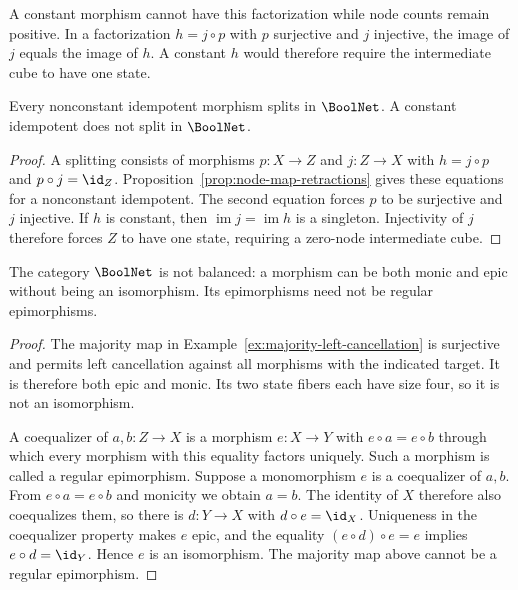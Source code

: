 A constant morphism cannot have this factorization while node counts remain positive. In a factorization $h=j\circ p$ with $p$ surjective and $j$ injective, the image of $j$ equals the image of $h$. A constant $h$ would therefore require the intermediate cube to have one state.

\begin{proposition}\label{prop:category-idempotents}
Every nonconstant idempotent morphism splits in $\BoolNet$. A constant idempotent does not split in $\BoolNet$.
\end{proposition}

\begin{proof}
A splitting consists of morphisms $p\colon X\to Z$ and $j\colon Z\to X$ with $h=j\circ p$ and $p\circ j=\id_Z$. Proposition~\ref{prop:node-map-retractions} gives these equations for a nonconstant idempotent. The second equation forces $p$ to be surjective and $j$ injective. If $h$ is constant, then $\operatorname{im}j=\operatorname{im}h$ is a singleton. Injectivity of $j$ therefore forces $Z$ to have one state, requiring a zero-node intermediate cube.
\end{proof}

\begin{proposition}\label{prop:category-nonbalanced}
The category $\BoolNet$ is not balanced: a morphism can be both monic and epic without being an isomorphism. Its epimorphisms need not be regular epimorphisms.
\end{proposition}

\begin{proof}
The majority map in Example~\ref{ex:majority-left-cancellation} is surjective and permits left cancellation against all morphisms with the indicated target. It is therefore both epic and monic. Its two state fibers each have size four, so it is not an isomorphism.

A coequalizer of $a,b\colon Z\to X$ is a morphism $e\colon X\to Y$ with $e\circ a=e\circ b$ through which every morphism with this equality factors uniquely. Such a morphism is called a regular epimorphism. Suppose a monomorphism $e$ is a coequalizer of $a,b$. From $e\circ a=e\circ b$ and monicity we obtain $a=b$. The identity of $X$ therefore also coequalizes them, so there is $d\colon Y\to X$ with $d\circ e=\id_X$. Uniqueness in the coequalizer property makes $e$ epic, and the equality $(e\circ d)\circ e=e$ implies $e\circ d=\id_Y$. Hence $e$ is an isomorphism. The majority map above cannot be a regular epimorphism.
\end{proof}

